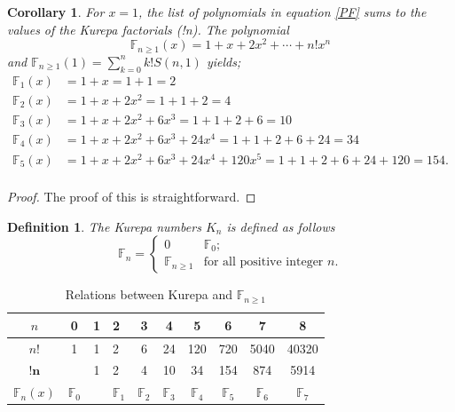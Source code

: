 \documentclass[pdflatex,sn-mathphys-num]{sn-jnl}%
\newtheorem{definition}{Definition}
\newtheorem{corollary}{Corollary}
\theoremstyle{thmstyleone}%
\theoremstyle{thmstyletwo}%
\theoremstyle{thmstylethree}%
\begin{document}
\begin{corollary}
    For $x=1$, the list of polynomials in equation \ref{PF} sums to the values of the Kurepa factorials (!n). The polynomial
    $$\mathbb{F}_{n\geq1}(x)= 1+x+2x^2+\cdots+n!x^n$$ and 
    $\mathbb{F}_{n\geq1}(1) = \sum_{k=0}^n k! S(n,1)$ yields; 
\begin{align*}\label{PF}
\mathbb{F}_{1}(x) &= 1 + x=1+1=2\\  \nonumber
\mathbb{F}_{2}(x) &= 1 + x + 2x^2=1+1+2=4\\  \nonumber
\mathbb{F}_{3}(x) &= 1 + x + 2x^2 + 6x^3=1+1+2+6=10\\  \nonumber
\mathbb{F}_{4}(x) &= 1 + x + 2x^2 + 6x^3 + 24x^4=1+1+2+6+24=34\\  \nonumber
\mathbb{F}_{5}(x) &= 1 + x + 2x^2 + 6x^3 + 24x^4 + 120x^5=1+1+2+6+24+120=154.\\  
\end{align*}  
\end{corollary}
\begin{proof}
    The proof of this is straightforward.
\end{proof}





\begin{definition}
    The Kurepa numbers $K_n$ is defined as follows
    \begin{equation*}
\mathbb{F}_n=
\begin{cases}
	\text{0}    & \text{$\mathbb{F}_{0}$;}\\
	\text{$\mathbb{F}_{n\geq1}$}   & \text{for all positive integer $n$}.
\end{cases}
 \end{equation*}
    
\end{definition}








\begin{table}[!ht]\label{T}
    \centering
    \begin{tabular}{|c|c|c|a|c|c|c|c|c|c|}\hline 
        $n$& 0 & 1 & 2 & 3 &4  &5  & 6 & 7 &8 \\\hline 
         $n!$& 1 & 1 & 2 & 6 & 24 &120  & 720 & 5040 &40320 \\\hline
        $\mathbf{!n}$ &  & 1 & 2 & 4 & 10 & 34 & 154 & 874 &5914 \\\hline
         $\mathbb{F}_{n}(x)$ & $\mathbb{F}_{0}$ &  & $\mathbb{F}_{1}$ & $\mathbb{F}_{2}$ &$\mathbb{F}_{3}$ &$\mathbb{F}_{4}$& $\mathbb{F}_{5}$ & $\mathbb{F}_{6}$ &$\mathbb{F}_{7}$ \\\hline
    \end{tabular}
    \caption{Relations between Kurepa and $\mathbb{F}_{n\geq1}$ \cite{OEIS:A003422, OEIS:A005165} }
    \label{table 5}
\end{table}
\end{document}
